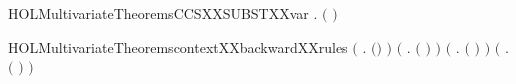 \newcommand{\HOLMultivariateTheoremsCCSXXSUBSTXXsum}{\UseVerbatim{HOLMultivariateTheoremsCCSXXSUBSTXXsum}}
\begin{SaveVerbatim}{HOLMultivariateTheoremsCCSXXSUBSTXXvar}
\HOLTokenTurnstile{} \HOLSymConst{\HOLTokenForall{}} .
         \ensuremath{(} \ensuremath{)} \HOLSymConst{\ensuremath{=}}
         \HOLConst{\HOLTokenIn{}}         
\end{SaveVerbatim}
\newcommand{\HOLMultivariateTheoremsCCSXXSUBSTXXvar}{\UseVerbatim{HOLMultivariateTheoremsCCSXXSUBSTXXvar}}
\begin{SaveVerbatim}{HOLMultivariateTheoremscontextXXbackwardXXrules}
\HOLTokenTurnstile{} \ensuremath{(}\HOLSymConst{\HOLTokenForall{}}  .   \ensuremath{(}\HOLSymConst{\ensuremath{\ldotp}}\ensuremath{)} \HOLSymConst{\HOLTokenImp{}}   \ensuremath{)} \HOLSymConst{\HOLTokenConj{}}
   \ensuremath{(}\HOLSymConst{\HOLTokenForall{}}  .
          \ensuremath{(} \HOLSymConst{\ensuremath{+}} \ensuremath{)} \HOLSymConst{\HOLTokenImp{}}    \HOLSymConst{\HOLTokenConj{}}   \ensuremath{)} \HOLSymConst{\HOLTokenConj{}}
   \ensuremath{(}\HOLSymConst{\HOLTokenForall{}}  .
          \ensuremath{(} \HOLSymConst{\ensuremath{\mid}} \ensuremath{)} \HOLSymConst{\HOLTokenImp{}}    \HOLSymConst{\HOLTokenConj{}}   \ensuremath{)} \HOLSymConst{\HOLTokenConj{}}
   \ensuremath{(}\HOLSymConst{\HOLTokenForall{}}  .   \ensuremath{(}  \ensuremath{)} \HOLSymConst{\HOLTokenImp{}}   \ensuremath{)} \HOLSymConst{\HOLTokenConj{}}

\end{SaveVerbatim}
